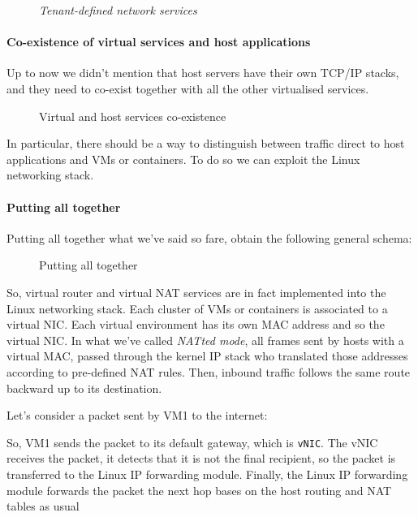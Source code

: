 \begin{figure}[ht!]
    \centering
    \caption{\emph{Tenant-defined network services}}
\end{figure}

\paragraph{Co-existence of virtual services and host applications}
Up to now we didn't mention that host servers have their own TCP/IP stacks, and
they need to co-exist together with all the other virtualised services.

\begin{figure}[h!]
    \centering
    \caption{Virtual and host services co-existence}
\end{figure}

\noindent
In particular, there should be a way to distinguish between traffic direct to
host applications and VMs or containers. To do so we can exploit the Linux
networking stack.

\paragraph{Putting all together}
Putting all together what we've said so fare, obtain the following general schema:

\begin{figure}[h!]
    \centering
    \caption{Putting all together}
\end{figure}

\noindent
So, virtual router and virtual NAT services are in fact implemented into the
Linux networking stack. Each cluster of VMs or containers is associated to a
virtual NIC. Each virtual environment has its own MAC address and so the virtual
NIC. In what we've called \emph{NATted mode}, all frames sent by hosts with
a virtual MAC, passed through the kernel IP stack who translated those addresses
according to pre-defined NAT rules. Then, inbound traffic follows the same route
backward up to its destination.

\begin{eg}
    Let's consider a packet sent by VM1 to the internet:

    \begin{figure}[h!]
        \centering
        \hfill
    \end{figure}

    \noindent
    So, VM1 sends the packet to its default gateway, which is \texttt{vNIC}. 
    The vNIC receives the packet, it detects that it is not the final recipient,
    so the packet is transferred to the Linux IP forwarding module. Finally,
    the Linux IP forwarding module forwards the packet the next hop bases on
    the host routing and NAT tables as usual
\end{eg}

